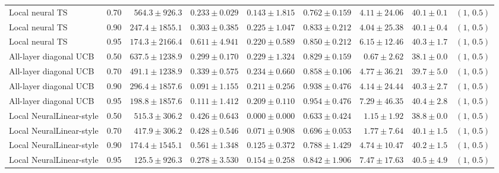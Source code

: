 {\begin{tabular}{llrrrrrrl}
Local neural TS & 0.70 & $564.3\mathbin{\pm}926.3$ & $0.233\mathbin{\pm}0.029$ & $0.143\mathbin{\pm}1.815$ & $0.762\mathbin{\pm}0.159$ & $4.11\mathbin{\pm}24.06$ & $40.1\mathbin{\pm}0.1$ & $(1,\,0.5)$ \\
Local neural TS & 0.90 & $247.4\mathbin{\pm}1855.1$ & $0.303\mathbin{\pm}0.385$ & $0.225\mathbin{\pm}1.047$ & $0.833\mathbin{\pm}0.212$ & $4.04\mathbin{\pm}25.38$ & $40.1\mathbin{\pm}0.4$ & $(1,\,0.5)$ \\
Local neural TS & 0.95 & $174.3\mathbin{\pm}2166.4$ & $0.611\mathbin{\pm}4.941$ & $0.220\mathbin{\pm}0.589$ & $0.850\mathbin{\pm}0.212$ & $6.15\mathbin{\pm}12.46$ & $40.3\mathbin{\pm}1.7$ & $(1,\,0.5)$ \\
\addlinespace[1pt]
All-layer diagonal UCB & 0.50 & $637.5\mathbin{\pm}1238.9$ & $0.299\mathbin{\pm}0.170$ & $0.229\mathbin{\pm}1.324$ & $0.829\mathbin{\pm}0.159$ & $0.67\mathbin{\pm}2.62$ & $38.1\mathbin{\pm}0.0$ & $(1,\,0.5)$ \\
All-layer diagonal UCB & 0.70 & $491.1\mathbin{\pm}1238.9$ & $0.339\mathbin{\pm}0.575$ & $0.234\mathbin{\pm}0.660$ & $0.858\mathbin{\pm}0.106$ & $4.77\mathbin{\pm}36.21$ & $39.7\mathbin{\pm}5.0$ & $(1,\,0.5)$ \\
All-layer diagonal UCB & 0.90 & $296.4\mathbin{\pm}1857.6$ & $0.091\mathbin{\pm}1.155$ & $0.211\mathbin{\pm}0.256$ & $0.938\mathbin{\pm}0.476$ & $4.14\mathbin{\pm}24.44$ & $40.3\mathbin{\pm}2.7$ & $(1,\,0.5)$ \\
All-layer diagonal UCB & 0.95 & $198.8\mathbin{\pm}1857.6$ & $0.111\mathbin{\pm}1.412$ & $0.209\mathbin{\pm}0.110$ & $0.954\mathbin{\pm}0.476$ & $7.29\mathbin{\pm}46.35$ & $40.4\mathbin{\pm}2.8$ & $(1,\,0.5)$ \\
\addlinespace[1pt]
Local NeuralLinear-style & 0.50 & $515.3\mathbin{\pm}306.2$ & $0.426\mathbin{\pm}0.643$ & $0.000\mathbin{\pm}0.000$ & $0.633\mathbin{\pm}0.424$ & $1.15\mathbin{\pm}1.92$ & $38.8\mathbin{\pm}0.0$ & $(1,\,0.5)$ \\
Local NeuralLinear-style & 0.70 & $417.9\mathbin{\pm}306.2$ & $0.428\mathbin{\pm}0.546$ & $0.071\mathbin{\pm}0.908$ & $0.696\mathbin{\pm}0.053$ & $1.77\mathbin{\pm}7.64$ & $40.1\mathbin{\pm}1.5$ & $(1,\,0.5)$ \\
Local NeuralLinear-style & 0.90 & $174.4\mathbin{\pm}1545.1$ & $0.561\mathbin{\pm}1.348$ & $0.125\mathbin{\pm}0.372$ & $0.788\mathbin{\pm}1.429$ & $4.74\mathbin{\pm}10.47$ & $40.2\mathbin{\pm}1.5$ & $(1,\,0.5)$ \\
Local NeuralLinear-style & 0.95 & $125.5\mathbin{\pm}926.3$ & $0.278\mathbin{\pm}3.530$ & $0.154\mathbin{\pm}0.258$ & $0.842\mathbin{\pm}1.906$ & $7.47\mathbin{\pm}17.63$ & $40.5\mathbin{\pm}4.9$ & $(1,\,0.5)$ \\

\end{tabular}}
